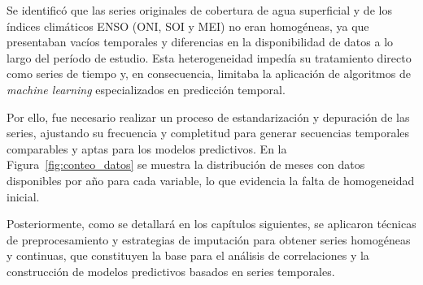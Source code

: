Se identificó que las series originales de cobertura de agua superficial y de los índices climáticos ENSO (ONI, SOI y MEI) no eran homogéneas, ya que presentaban vacíos temporales y diferencias en la disponibilidad de datos a lo largo del período de estudio. Esta heterogeneidad impedía su tratamiento directo como series de tiempo y, en consecuencia, limitaba la aplicación de algoritmos de \textit{machine learning} especializados en predicción temporal.  

Por ello, fue necesario realizar un proceso de estandarización y depuración de las series, ajustando su frecuencia y completitud para generar secuencias temporales comparables y aptas para los modelos predictivos. En la Figura~\ref{fig:conteo_datos} se muestra la distribución de meses con datos disponibles por año para cada variable, lo que evidencia la falta de homogeneidad inicial. 

Posteriormente, como se detallará en los capítulos siguientes, se aplicaron técnicas de preprocesamiento y estrategias de imputación para obtener series homogéneas y continuas, que constituyen la base para el análisis de correlaciones y la construcción de modelos predictivos basados en series temporales.  




